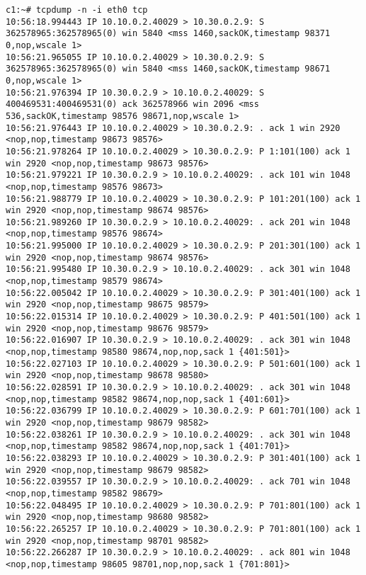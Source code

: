 \documentclass[a4paper,12pt]{article}
\begin{document}
\begin{Verbatim}
c1:~# tcpdump -n -i eth0 tcp
10:56:18.994443 IP 10.10.0.2.40029 > 10.30.0.2.9: S 362578965:362578965(0) win 5840 <mss 1460,sackOK,timestamp 98371 0,nop,wscale 1>
10:56:21.965055 IP 10.10.0.2.40029 > 10.30.0.2.9: S 362578965:362578965(0) win 5840 <mss 1460,sackOK,timestamp 98671 0,nop,wscale 1>
10:56:21.976394 IP 10.30.0.2.9 > 10.10.0.2.40029: S 400469531:400469531(0) ack 362578966 win 2096 <mss 536,sackOK,timestamp 98576 98671,nop,wscale 1>
10:56:21.976443 IP 10.10.0.2.40029 > 10.30.0.2.9: . ack 1 win 2920 <nop,nop,timestamp 98673 98576>
10:56:21.978264 IP 10.10.0.2.40029 > 10.30.0.2.9: P 1:101(100) ack 1 win 2920 <nop,nop,timestamp 98673 98576>
10:56:21.979221 IP 10.30.0.2.9 > 10.10.0.2.40029: . ack 101 win 1048 <nop,nop,timestamp 98576 98673>
10:56:21.988779 IP 10.10.0.2.40029 > 10.30.0.2.9: P 101:201(100) ack 1 win 2920 <nop,nop,timestamp 98674 98576>
10:56:21.989260 IP 10.30.0.2.9 > 10.10.0.2.40029: . ack 201 win 1048 <nop,nop,timestamp 98576 98674>
10:56:21.995000 IP 10.10.0.2.40029 > 10.30.0.2.9: P 201:301(100) ack 1 win 2920 <nop,nop,timestamp 98674 98576>
10:56:21.995480 IP 10.30.0.2.9 > 10.10.0.2.40029: . ack 301 win 1048 <nop,nop,timestamp 98579 98674>
10:56:22.005042 IP 10.10.0.2.40029 > 10.30.0.2.9: P 301:401(100) ack 1 win 2920 <nop,nop,timestamp 98675 98579>
10:56:22.015314 IP 10.10.0.2.40029 > 10.30.0.2.9: P 401:501(100) ack 1 win 2920 <nop,nop,timestamp 98676 98579>
10:56:22.016907 IP 10.30.0.2.9 > 10.10.0.2.40029: . ack 301 win 1048 <nop,nop,timestamp 98580 98674,nop,nop,sack 1 {401:501}>
10:56:22.027103 IP 10.10.0.2.40029 > 10.30.0.2.9: P 501:601(100) ack 1 win 2920 <nop,nop,timestamp 98678 98580>
10:56:22.028591 IP 10.30.0.2.9 > 10.10.0.2.40029: . ack 301 win 1048 <nop,nop,timestamp 98582 98674,nop,nop,sack 1 {401:601}>
10:56:22.036799 IP 10.10.0.2.40029 > 10.30.0.2.9: P 601:701(100) ack 1 win 2920 <nop,nop,timestamp 98679 98582>
10:56:22.038261 IP 10.30.0.2.9 > 10.10.0.2.40029: . ack 301 win 1048 <nop,nop,timestamp 98582 98674,nop,nop,sack 1 {401:701}>
10:56:22.038293 IP 10.10.0.2.40029 > 10.30.0.2.9: P 301:401(100) ack 1 win 2920 <nop,nop,timestamp 98679 98582>
10:56:22.039557 IP 10.30.0.2.9 > 10.10.0.2.40029: . ack 701 win 1048 <nop,nop,timestamp 98582 98679>
10:56:22.048495 IP 10.10.0.2.40029 > 10.30.0.2.9: P 701:801(100) ack 1 win 2920 <nop,nop,timestamp 98680 98582>
10:56:22.265257 IP 10.10.0.2.40029 > 10.30.0.2.9: P 701:801(100) ack 1 win 2920 <nop,nop,timestamp 98701 98582>
10:56:22.266287 IP 10.30.0.2.9 > 10.10.0.2.40029: . ack 801 win 1048 <nop,nop,timestamp 98605 98701,nop,nop,sack 1 {701:801}>

\end{Verbatim}
\end{document}
